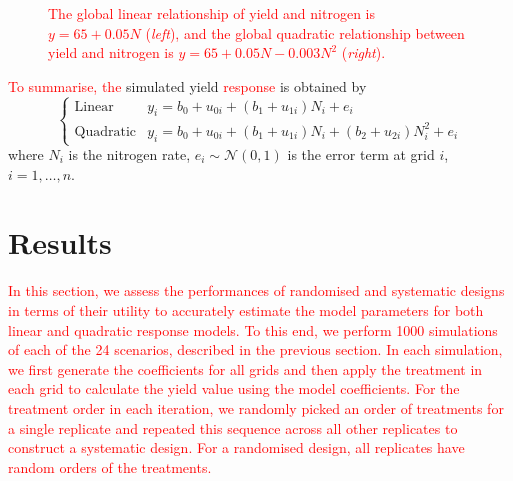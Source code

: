 \documentclass[a4paper]{article} 	%
\newcommand{\N}{\mathcal{N}}
\newcommand{\revision}[1]{\textcolor{red}{#1}}
\newcommand{\zc}[1]{\textcolor{red}{#1}}
\begin{document}
\begin{figure}[H]
\begin{subfigure}[t]{0.45\textwidth}
 \end{subfigure}
	\caption{\revision{The global linear relationship of yield and nitrogen is $y=65+0.05N$ (\textit{left}), and the global quadratic relationship between yield and nitrogen is $y=65+0.05N-0.003N^2$ (\textit{right}).}}\label{fig:Lines}
\end{figure}


\zc{To summarise, the} simulated yield \revision{response} is obtained by 
\begin{equation}
\begin{cases}
	\text{Linear}  &y_i = b_0 + u_{0i} + (b_1 + u_{1i})N_i + e_i \\
	\text{Quadratic} &y_i = b_0 + u_{0i} + (b_1 + u_{1i})N_i + (b_2 + u_{2i})N_i^2 + e_i
\end{cases}
\end{equation}
where $N_i$ is the nitrogen rate, $e_i\sim \N(0,1)$ is the error term at grid $i$, $i = 1, \ldots, n$. 



\section{Results}\label{Sec:Res}

\revision{In this section, we assess the performances of randomised and systematic designs in terms of their utility to accurately estimate the model parameters for both linear and quadratic response models. To this end, we perform 1000 simulations of each \revision{of the 24} scenarios\zc{, described} in the previous section.} \zc{In each simulation, we first generate the coefficients for all grids and then apply the treatment in each grid to calculate the yield value using the model coefficients. For the treatment order in each iteration, we randomly picked an order of treatments for a single replicate and repeated this sequence across all other replicates to construct a systematic design. For a randomised design, all replicates have random orders of the treatments.}

\end{document}
